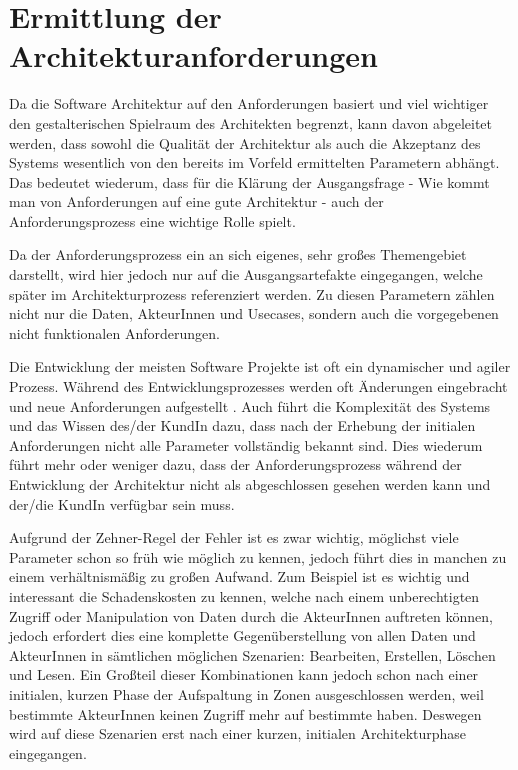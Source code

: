 \chapter{Ermittlung der Architekturanforderungen}
Da die Software Architektur auf den Anforderungen basiert und viel wichtiger \glqq den gestalterischen Spielraum des Architekten\grqq \cite[S. 103]{softarch} begrenzt, kann davon abgeleitet werden, dass sowohl die Qualität der Architektur als auch die Akzeptanz des Systems wesentlich von den bereits im Vorfeld ermittelten Parametern abhängt. Das bedeutet wiederum, dass für die Klärung der Ausgangsfrage - Wie kommt man von Anforderungen auf eine gute Architektur - auch der Anforderungsprozess eine wichtige Rolle spielt.

Da der Anforderungsprozess ein an sich eigenes, sehr großes Themengebiet darstellt, wird hier jedoch nur auf die Ausgangsartefakte eingegangen, welche später im Architekturprozess referenziert werden. Zu diesen Parametern zählen nicht nur die Daten, AkteurInnen und Usecases, sondern auch die vorgegebenen nicht funktionalen Anforderungen.

Die Entwicklung der meisten Software Projekte ist oft ein dynamischer und agiler Prozess. Während des Entwicklungsprozesses werden oft Änderungen eingebracht und neue Anforderungen aufgestellt  \cite[S. 6-7, S. 37]{effektiv}. Auch führt die Komplexität des Systems und das Wissen des/der KundIn dazu, dass nach der Erhebung der initialen Anforderungen nicht alle Parameter vollständig bekannt sind. Dies wiederum führt mehr oder weniger dazu, dass der Anforderungsprozess während der Entwicklung der Architektur nicht als abgeschlossen gesehen werden kann und der/die KundIn verfügbar sein muss.

Aufgrund der Zehner-Regel der Fehler \cite[S. 154]{fehler} ist es zwar wichtig, möglichst viele Parameter schon so früh wie möglich zu kennen, jedoch führt dies in manchen zu einem verhältnismäßig zu großen Aufwand. Zum Beispiel ist es wichtig und interessant die Schadenskosten zu kennen, welche nach einem unberechtigten Zugriff oder Manipulation von Daten durch die AkteurInnen auftreten können, jedoch erfordert dies eine komplette Gegenüberstellung von allen Daten und AkteurInnen in sämtlichen möglichen Szenarien: Bearbeiten, Erstellen, Löschen und Lesen. Ein Großteil dieser Kombinationen kann jedoch schon nach einer initialen, kurzen Phase der Aufspaltung in Zonen ausgeschlossen werden, weil bestimmte AkteurInnen keinen Zugriff mehr auf bestimmte haben. Deswegen wird auf diese Szenarien erst nach einer kurzen, initialen Architekturphase eingegangen.


